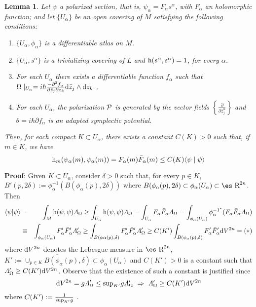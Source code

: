 \documentclass[12pt]{article}
\theoremstyle{plain}
\newtheorem{lem}{Lemma}
\def\beann{\begin{eqnarray*}}
\def\eeann{\end{eqnarray*}}
\def\dst{\(}
\def\derpar#1#2{\frac{\partial{#1}}{\partial{#2}}}
\def\d{{\rm d}}
\def\P{{\cal P}}
\def\h{{\rm h}}
\def\Real{\mbox{\es R}}
\def\LF{{\mit\Lambda}_{\Omega}}
\begin{document}
\begin{lem}
Let $\psi$ a polarized section,
that is, $\psi_\alpha = F_\alpha s^\alpha$,
with $F_\alpha$ an holomorphic function;
and let $\{U_\alpha\}$ be an open covering of $M$
satisfying the following conditions:
\begin{enumerate}
\item
$\{ U_\alpha ,\phi_\alpha \}$ is a differentiable atlas on $M$.
\item
$\{ U_\alpha ,s^\alpha \}$ is a trivializing covering of $L$ and
$\h (s^\alpha ,s^\alpha ) = 1$, for every $\alpha$.
\item
For each $U_\alpha$ there exists a differentiable function
$f_\alpha$ such that
\dst  \Omega \mid _{U_\alpha} =
i \hbar\frac{-\partial^2 f_\alpha}{\partial \bar z_j \partial z_k}
\d \bar z_j \wedge \d z_k\) .
\item
For each $U_\alpha$, the polarization $\P$ is generated by the
vector fields \dst\left\{ \derpar{}{\bar z_j^\alpha}\right\}\)
and $\theta = i\hbar \partial f_\alpha$
is an adapted symplectic potential.
\end{enumerate}
Then, for each compact $K \subset U_\alpha$,
there exists a constant $C(K)>0$ such that,
if $m \in K$, we have
$$
\h_m (\psi_\alpha (m) , \psi_\alpha (m))
= F_\alpha (m) \bar F_\alpha (m)
\leq C(K) \langle \psi \mid \psi \rangle
$$
\end{lem}
{\bf Proof}:
Given $K \subset U_\alpha$, consider $\delta >0$ such that,
for every $p \in K$,
$B'(p,2\delta ) := \phi_\alpha^{-1}(B(\phi_\alpha (p),2\delta ))$
where
$B(\phi_\alpha (p),2\delta ) \subset \phi_\alpha(U_\alpha )
\subset \Real^{2n}$.
Then
\beann
\langle \psi | \psi \rangle &=&
\int_M \h (\psi ,\psi ) \LF
\geq
\int_{U_\alpha} \h (\psi ,\psi ) \LF =
\int_{U_\alpha} F_\alpha \bar F_\alpha \LF =
\int_{\phi_\alpha (U_\alpha )}\phi_\alpha^{{-1}^*}(F_\alpha \bar
F_\alpha \LF)
\\ &\equiv&
\int_{\phi_\alpha (U_\alpha )}F'_\alpha \bar F'_\alpha \LF '
\geq
\int_{B(\phi\alpha (p),\delta )}F'_\alpha \bar F'_\alpha \LF '
\geq
C(K') \int_{B(\phi_\alpha (p),\delta )}F'_\alpha \bar F'_\alpha \d
V^{2n}
= (*)
\eeann
where $\d V^{2n}$ denotes the Lebesgue measure in $\Real^{2n}$,
 $K':=\overline{\cup_{p\in K}B(\phi_\alpha (p),\delta)}
 \subset\phi_\alpha(U_\alpha)$
and $C(K') > 0$ is a constant such that $\LF ' \geq C(K') \d V^{2n}$.
Observe that the existence of such a constant is justified since
$$
\d V^{2n} = g \LF ' \leq {\rm sup}_{K'} g \LF '
\ \Rightarrow \
\LF ' \geq C(K') \d V^{2n}
$$
where \dst C(K') :=  \frac{1}{{\rm sup}_{K'}g}\) .
\end{document}
